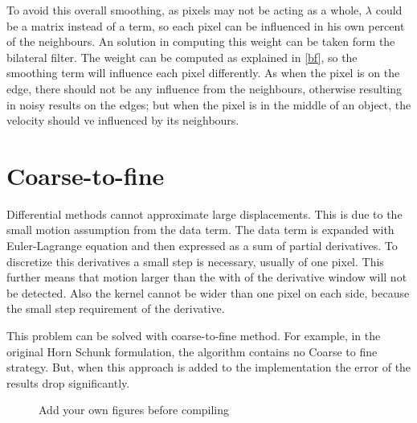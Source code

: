 \documentclass[12pt,a4paper,twoside]{report}
\begin{document}
To avoid this overall smoothing, as pixels may not be acting as a whole, $\lambda$ could be a matrix instead of a term, so each pixel can be influenced in his own percent of the neighbours.
An solution in computing this weight can be taken form the bilateral filter. The weight can be computed as explained in
\ref{bf}, so the smoothing term will influence each pixel differently. As when the pixel is on the edge, there should not be any influence from the neighbours, otherwise resulting in noisy results on the edges; but when the pixel is in the middle of an object, the velocity should ve influenced by its neighbours.

\section{Coarse-to-fine}
Differential methods cannot approximate large displacements. This is due to the small motion assumption from the data term.
The data term is expanded with Euler-Lagrange equation and then expressed as a sum of partial derivatives. To discretize this derivatives a small step is necessary, usually of one pixel. This further means that motion larger than the with of the derivative window will not be detected. Also the kernel cannot be wider than one pixel on each side, because the small step requirement of the derivative.


This problem can be solved with coarse-to-fine method.
For example, in the original Horn Schunk formulation, the algorithm contains no Coarse to fine strategy. But, when this approach is added to the implementation the error of the results drop significantly. 




\begin{figure}
	\caption{Add your own figures before compiling}
	\label{some example}
\end{figure}
\end{document}
